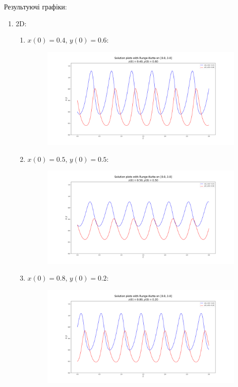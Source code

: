 Результуючі графіки:
\begin{enumerate}
	\item 2D:
	\begin{enumerate}
		\item $x(0) = 0.4$, $y(0) = 0.6$:
		\begin{figure}
			\centering
			\includegraphics[width=\textwidth]{plot_2d_0.40_0.60.png}
		\end{figure}
		\item $x(0) = 0.5$, $y(0) = 0.5$:
		\begin{figure}
			\centering
			\includegraphics[width=\textwidth]{plot_2d_0.50_0.50.png}
		\end{figure}
		\item $x(0) = 0.8$, $y(0) = 0.2$:
		\begin{figure}
			\centering
			\includegraphics[width=\textwidth]{plot_2d_0.80_0.20.png}

\end{figure}
\end{enumerate}
\end{enumerate}
